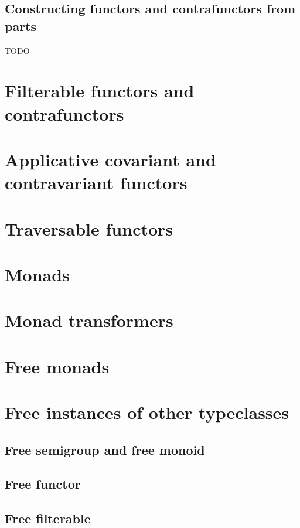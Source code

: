 \subsection{Constructing functors and contrafunctors from parts}


TODO


\section{Filterable functors and contrafunctors}


\section{Applicative covariant and contravariant functors}


\section{Traversable functors}


\section{Monads}


\section{Monad transformers}


\section{Free monads}


\section{Free instances of other typeclasses}


\subsection{Free semigroup and free monoid}


\subsection{Free functor}


\subsection{Free filterable}


